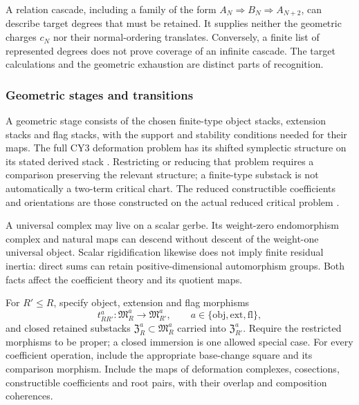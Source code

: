 A relation cascade, including a family of the form
\(A_N\Rightarrow B_N\Rightarrow A_{N+2}\), can describe target
degrees that must be retained. It supplies neither the geometric
charges \(c_N\) nor their normal-ordering translates. Conversely,
a finite list of represented degrees does not prove coverage of an
infinite cascade. The target calculations and the geometric
exhaustion are distinct parts of recognition.

\subsubsection*{Geometric stages and transitions}

A geometric stage consists of the chosen finite-type object stacks,
extension stacks and flag stacks, with the support and stability
conditions needed for their maps. The full CY3 deformation problem
has its shifted symplectic structure on its stated derived stack
\cite{PTVV2013}. Restricting or reducing that problem requires a
comparison preserving the relevant structure; a finite-type
substack is not automatically a two-term critical chart.
The reduced constructible coefficients and orientations are those
constructed on the actual reduced critical problem
\cite{BBDJS2015,JoyceUpmeier}.

A universal complex may live on a scalar gerbe. Its weight-zero
endomorphism complex and natural maps can descend without descent
of the weight-one universal object. Scalar rigidification likewise
does not imply finite residual inertia: direct sums can retain
positive-dimensional automorphism groups. Both facts affect the
coefficient theory and its quotient maps.

\begin{definition}
\label{def:finite-moduli-transition-geometry}
For \(R'\le R\), specify object, extension and flag morphisms
\[
 t^a_{RR'}:\mathfrak M^a_R\longrightarrow\mathfrak M^a_{R'},
 \qquad a\in\{\mathrm{obj},\mathrm{ext},\mathrm{fl}\},
\]
and closed retained substacks
\(\mathfrak Z^a_R\subset\mathfrak M^a_R\) carried into
\(\mathfrak Z^a_{R'}\). Require the restricted morphisms to be
proper; a closed immersion is one allowed special case.
For every coefficient operation, include the appropriate base-change
square and its comparison morphism. Include the maps of deformation
complexes, cosections, constructible coefficients and root pairs,
with their overlap and composition coherences.
\end{definition}

